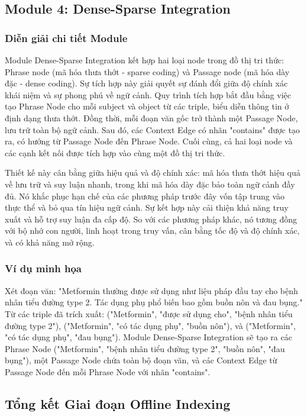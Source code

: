 \subsection{Module 4: Dense-Sparse Integration}

\subsubsection{Diễn giải chi tiết Module}
Module Dense-Sparse Integration kết hợp hai loại node trong đồ thị tri thức: Phrase node (mã hóa thưa thớt - sparse coding) và Passage node (mã hóa dày đặc - dense coding). Sự tích hợp này giải quyết sự đánh đổi giữa độ chính xác khái niệm và sự phong phú về ngữ cảnh. Quy trình tích hợp bắt đầu bằng việc tạo Phrase Node cho mỗi subject và object từ các triple, biểu diễn thông tin ở định dạng thưa thớt. Đồng thời, mỗi đoạn văn gốc trở thành một Passage Node, lưu trữ toàn bộ ngữ cảnh. Sau đó, các Context Edge có nhãn "contains" được tạo ra, có hướng từ Passage Node đến Phrase Node. Cuối cùng, cả hai loại node và các cạnh kết nối được tích hợp vào cùng một đồ thị tri thức.

Thiết kế này cân bằng giữa hiệu quả và độ chính xác: mã hóa thưa thớt hiệu quả về lưu trữ và suy luận nhanh, trong khi mã hóa dày đặc bảo toàn ngữ cảnh đầy đủ. Nó khắc phục hạn chế của các phương pháp trước đây vốn tập trung vào thực thể và bỏ qua tín hiệu ngữ cảnh. Sự kết hợp này cải thiện khả năng truy xuất và hỗ trợ suy luận đa cấp độ. So với các phương pháp khác, nó tương đồng với bộ nhớ con người, linh hoạt trong truy vấn, cân bằng tốc độ và độ chính xác, và có khả năng mở rộng.

\subsubsection{Ví dụ minh họa}
Xét đoạn văn: "Metformin thường được sử dụng như liệu pháp đầu tay cho bệnh nhân tiểu đường type 2. Tác dụng phụ phổ biến bao gồm buồn nôn và đau bụng." Từ các triple đã trích xuất: ("Metformin", "được sử dụng cho", "bệnh nhân tiểu đường type 2"), ("Metformin", "có tác dụng phụ", "buồn nôn"), và ("Metformin", "có tác dụng phụ", "đau bụng"). Module Dense-Sparse Integration sẽ tạo ra các Phrase Node ("Metformin", "bệnh nhân tiểu đường type 2", "buồn nôn", "đau bụng"), một Passage Node chứa toàn bộ đoạn văn, và các Context Edge từ Passage Node đến mỗi Phrase Node với nhãn "contains".

\subsection{Tổng kết Giai đoạn Offline Indexing}

